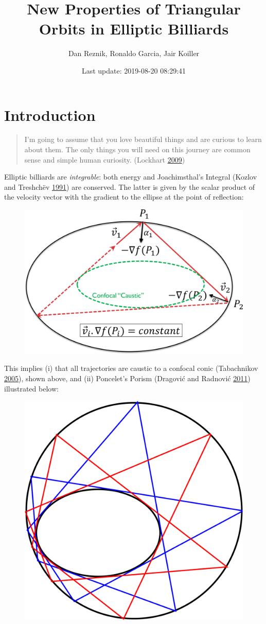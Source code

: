 \documentclass[]{article}
\title{New Properties of Triangular Orbits in Elliptic Billiards}
\author{Dan Reznik, Ronaldo Garcia, Jair Koiller}
\date{Last update: 2019-08-20 08:29:41}
\begin{document}
\maketitle

\hypertarget{introduction}{%
\section{Introduction}\label{introduction}}

\begin{quote}
I'm going to assume that you love beautiful things and are curious to learn about them. The only things you will need on this journey are common sense and simple human curiosity. (Lockhart \protect\hyperlink{ref-lockhart09}{2009})
\end{quote}

Elliptic billiards are \emph{integrable}: both energy and Joachimsthal's Integral (Kozlov and Treshchëv \protect\hyperlink{ref-kozlov91}{1991}) are conserved. The latter is given by the scalar product of the velocity vector with the gradient to the ellipse at the point of reflection:

\begin{figure}[H]

{\centering \includegraphics[width=0.5\linewidth]{pics/joachimsthal_integral} 

}

\end{figure}

This implies (i) that all trajectories are caustic to a confocal conic (Tabachnikov \protect\hyperlink{ref-sergei91}{2005}), shown above, and (ii) Poncelet's Porism (Dragović and Radnović \protect\hyperlink{ref-dragovic11}{2011}) illustrated below:

\begin{figure}[H]

{\centering \includegraphics[width=0.5\linewidth]{pics/porism} 

}

\end{figure}
\end{document}
